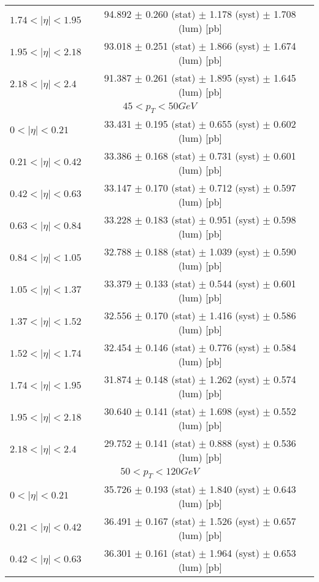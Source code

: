 \begin{tabular}{lc}
$1.74 < |\eta| <1.95$          & 94.892 $\pm$ 0.260 (stat) $\pm$ 1.178 (syst) $\pm$ 1.708 (lum) [pb]  \\
$1.95 < |\eta| <2.18$          & 93.018 $\pm$ 0.251 (stat) $\pm$ 1.866 (syst) $\pm$ 1.674 (lum) [pb]  \\
$2.18 < |\eta| <2.4$           & 91.387 $\pm$ 0.261 (stat) $\pm$ 1.895 (syst) $\pm$ 1.645 (lum) [pb]  \\
\hline
\multicolumn{2}{c}{$45 < p_{T} < 50 GeV$} \\
\hline
$0 < |\eta| <0.21$             & 33.431 $\pm$ 0.195 (stat) $\pm$ 0.655 (syst) $\pm$ 0.602 (lum) [pb]  \\
$0.21 < |\eta| <0.42$          & 33.386 $\pm$ 0.168 (stat) $\pm$ 0.731 (syst) $\pm$ 0.601 (lum) [pb]  \\
$0.42 < |\eta| <0.63$          & 33.147 $\pm$ 0.170 (stat) $\pm$ 0.712 (syst) $\pm$ 0.597 (lum) [pb]  \\
$0.63 < |\eta| <0.84$          & 33.228 $\pm$ 0.183 (stat) $\pm$ 0.951 (syst) $\pm$ 0.598 (lum) [pb]  \\
$0.84 < |\eta| <1.05$          & 32.788 $\pm$ 0.188 (stat) $\pm$ 1.039 (syst) $\pm$ 0.590 (lum) [pb]  \\
$1.05 < |\eta| <1.37$          & 33.379 $\pm$ 0.133 (stat) $\pm$ 0.544 (syst) $\pm$ 0.601 (lum) [pb]  \\
$1.37 < |\eta| <1.52$          & 32.556 $\pm$ 0.170 (stat) $\pm$ 1.416 (syst) $\pm$ 0.586 (lum) [pb]  \\
$1.52 < |\eta| <1.74$          & 32.454 $\pm$ 0.146 (stat) $\pm$ 0.776 (syst) $\pm$ 0.584 (lum) [pb]  \\
$1.74 < |\eta| <1.95$          & 31.874 $\pm$ 0.148 (stat) $\pm$ 1.262 (syst) $\pm$ 0.574 (lum) [pb]  \\
$1.95 < |\eta| <2.18$          & 30.640 $\pm$ 0.141 (stat) $\pm$ 1.698 (syst) $\pm$ 0.552 (lum) [pb]  \\
$2.18 < |\eta| <2.4$           & 29.752 $\pm$ 0.141 (stat) $\pm$ 0.888 (syst) $\pm$ 0.536 (lum) [pb]  \\
\hline
\multicolumn{2}{c}{$50 < p_{T} < 120 GeV$} \\
\hline
$0 < |\eta| <0.21$             & 35.726 $\pm$ 0.193 (stat) $\pm$ 1.840 (syst) $\pm$ 0.643 (lum) [pb]  \\
$0.21 < |\eta| <0.42$          & 36.491 $\pm$ 0.167 (stat) $\pm$ 1.526 (syst) $\pm$ 0.657 (lum) [pb]  \\
$0.42 < |\eta| <0.63$          & 36.301 $\pm$ 0.161 (stat) $\pm$ 1.964 (syst) $\pm$ 0.653 (lum) [pb]  \\

\end{tabular}
